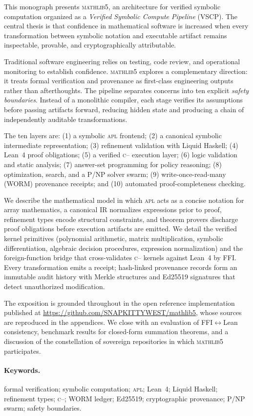 This monograph presents \textsc{mathlib5}, an architecture for verified
symbolic computation organized as a \emph{Verified Symbolic Compute Pipeline}
(VSCP). The central thesis is that confidence in mathematical software is
increased when every transformation between symbolic notation and executable
artifact remains inspectable, provable, and cryptographically attributable.

Traditional software engineering relies on testing, code review, and
operational monitoring to establish confidence. \textsc{mathlib5} explores a
complementary direction: it treats formal verification and provenance as
first-class engineering outputs rather than afterthoughts. The pipeline
separates concerns into ten explicit \emph{safety boundaries}. Instead of a
monolithic compiler, each stage verifies its assumptions before passing
artifacts forward, reducing hidden state and producing a chain of
independently auditable transformations.

The ten layers are: (1) a symbolic \textsc{apl} frontend; (2) a canonical
symbolic intermediate representation; (3) refinement validation with Liquid
Haskell; (4) Lean~4 proof obligations; (5) a verified \textsc{c{--}}
execution layer; (6) logic validation and static analysis; (7) answer-set
programming for policy reasoning; (8) optimization, search, and a P/NP
solver swarm; (9) write-once-read-many (WORM) provenance receipts; and (10)
automated proof-completeness checking.

We describe the mathematical model in which \textsc{apl} acts as a concise
notation for array mathematics, a canonical IR normalizes expressions prior
to proof, refinement types encode structural constraints, and theorem
provers discharge proof obligations before execution artifacts are emitted.
We detail the verified kernel primitives (polynomial arithmetic, matrix
multiplication, symbolic differentiation, algebraic decision procedures,
expression normalization) and the foreign-function bridge that cross-validates
\textsc{c{--}} kernels against Lean~4 by FFI. Every transformation emits a
receipt; hash-linked provenance records form an immutable audit history with
Merkle structures and Ed25519 signatures that detect unauthorized
modification.

The exposition is grounded throughout in the open reference implementation
published at \url{https://github.com/SNAPKITTYWEST/mathlib5}, whose sources
are reproduced in the appendices. We close with an evaluation of
FFI$\leftrightarrow$Lean consistency, benchmark results for closed-form
summation theorems, and a discussion of the constellation of sovereign
repositories in which \textsc{mathlib5} participates.

\paragraph{Keywords.} formal verification; symbolic computation; \textsc{apl};
Lean~4; Liquid Haskell; refinement types; \textsc{c{--}}; WORM ledger;
Ed25519; cryptographic provenance; P/NP swarm; safety boundaries.
